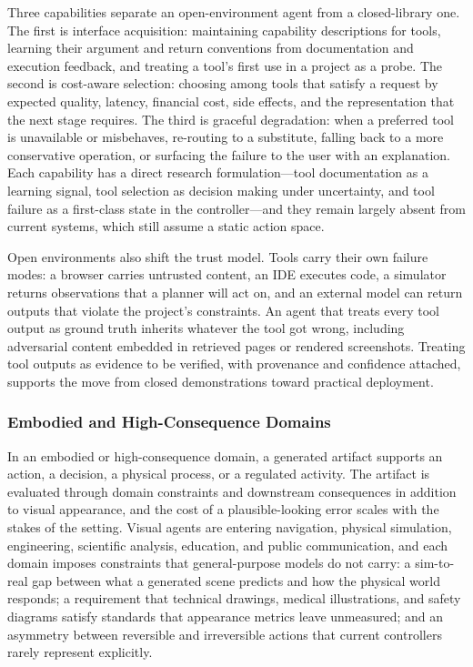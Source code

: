 Three capabilities separate an open-environment agent from a closed-library one. The first is interface acquisition: maintaining capability descriptions for tools, learning their argument and return conventions from documentation and execution feedback, and treating a tool's first use in a project as a probe. The second is cost-aware selection: choosing among tools that satisfy a request by expected quality, latency, financial cost, side effects, and the representation that the next stage requires. The third is graceful degradation: when a preferred tool is unavailable or misbehaves, re-routing to a substitute, falling back to a more conservative operation, or surfacing the failure to the user with an explanation. Each capability has a direct research formulation---tool documentation as a learning signal, tool selection as decision making under uncertainty, and tool failure as a first-class state in the controller---and they remain largely absent from current systems, which still assume a static action space.

Open environments also shift the trust model. Tools carry their own failure modes: a browser carries untrusted content, an IDE executes code, a simulator returns observations that a planner will act on, and an external model can return outputs that violate the project's constraints. An agent that treats every tool output as ground truth inherits whatever the tool got wrong, including adversarial content embedded in retrieved pages or rendered screenshots. Treating tool outputs as evidence to be verified, with provenance and confidence attached, supports the move from closed demonstrations toward practical deployment.

\subsubsection{Embodied and High-Consequence Domains}

In an embodied or high-consequence domain, a generated artifact supports an action, a decision, a physical process, or a regulated activity. The artifact is evaluated through domain constraints and downstream consequences in addition to visual appearance, and the cost of a plausible-looking error scales with the stakes of the setting. Visual agents are entering navigation, physical simulation, engineering, scientific analysis, education, and public communication, and each domain imposes constraints that general-purpose models do not carry: a sim-to-real gap between what a generated scene predicts and how the physical world responds; a requirement that technical drawings, medical illustrations, and safety diagrams satisfy standards that appearance metrics leave unmeasured; and an asymmetry between reversible and irreversible actions that current controllers rarely represent explicitly.

